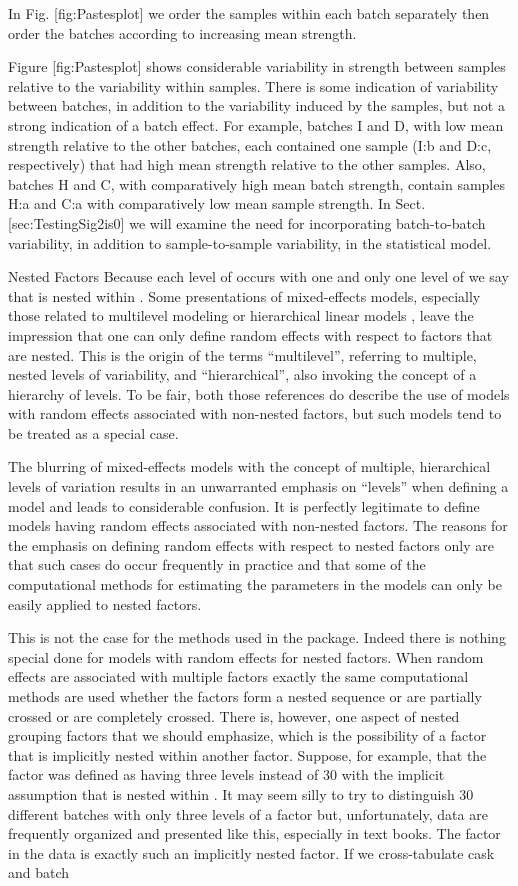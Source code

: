 In Fig. [fig:Pastesplot] we order the samples within each batch separately then order the batches according to increasing mean strength.

Figure [fig:Pastesplot] shows considerable variability in strength between samples relative to the variability within samples. There is some indication of variability between batches, in addition to the variability induced by the samples, but not a strong indication of a batch effect. For example, batches I and D, with low mean strength relative to the other batches, each contained one sample (I:b and D:c, respectively) that had high mean strength relative to the other samples. Also, batches H and C, with comparatively high mean batch strength, contain samples H:a and C:a with comparatively low mean sample strength. In Sect. [sec:TestingSig2is0] we will examine the need for incorporating batch-to-batch variability, in addition to sample-to-sample variability, in the statistical model.

Nested Factors
Because each level of occurs with one and only one level of we say that is nested within . Some presentations of mixed-effects models, especially those related to multilevel modeling  or hierarchical linear models , leave the impression that one can only define random effects with respect to factors that are nested. This is the origin of the terms “multilevel”, referring to multiple, nested levels of variability, and “hierarchical”, also invoking the concept of a hierarchy of levels. To be fair, both those references do describe the use of models with random effects associated with non-nested factors, but such models tend to be treated as a special case.

The blurring of mixed-effects models with the concept of multiple, hierarchical levels of variation results in an unwarranted emphasis on “levels” when defining a model and leads to considerable confusion. It is perfectly legitimate to define models having random effects associated with non-nested factors. The reasons for the emphasis on defining random effects with respect to nested factors only are that such cases do occur frequently in practice and that some of the computational methods for estimating the parameters in the models can only be easily applied to nested factors.

This is not the case for the methods used in the package. Indeed there is nothing special done for models with random effects for nested factors. When random effects are associated with multiple factors exactly the same computational methods are used whether the factors form a nested sequence or are partially crossed or are completely crossed. There is, however, one aspect of nested grouping factors that we should emphasize, which is the possibility of a factor that is implicitly nested within another factor. Suppose, for example, that the factor was defined as having three levels instead of 30 with the implicit assumption that is nested within . It may seem silly to try to distinguish 30 different batches with only three levels of a factor but, unfortunately, data are frequently organized and presented like this, especially in text books. The factor in the data is exactly such an implicitly nested factor. If we cross-tabulate cask and batch

